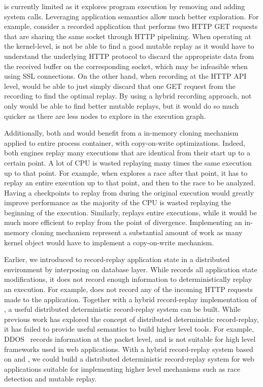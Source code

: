 \dora is currently limited as it explores program execution
by removing and adding system calls. Leveraging application semantics allow
much better exploration. For example, consider a recorded application that
performs two HTTP GET requests that are sharing the same socket through HTTP
pipelining. When operating at the kernel-level, \dora is not be able to
find a good mutable replay as it would have to understand the underlying HTTP
protocol to discard the appropriate data from the received buffer on the
corresponding socket, which may be infeasible when using SSL connections.
On the other hand, when recording at the HTTP API level, \dora would be able to
just simply discard that one GET request from the recording to find the optimal
replay. By using a hybrid recording approach, not only \dora would be able to
find better mutable replays, but it would do so much quicker as there are
less nodes to explore in the execution graph.

Additionally, both \racepro and \dora would benefit from a in-memory cloning
mechanism applied to entire process container, with copy-on-write optimizations.
Indeed, both engines replay many executions that are identical from their start
up to a certain point. A lot of CPU is wasted replaying many times the same
execution up to that point. For example, when \racepro explores a race after
that point, it has to replay an entire execution up to that point, and then to
the race to be analyzed. Having a checkpoints to replay from during the original
execution would greatly improve performance as the majority of the CPU is wasted
replaying the beginning of the execution. Similarly, \dora replays entire
executions, while it would be much more efficient to replay from the point of
divergence. Implementing an in-memory cloning mechanism represent a substantial
amount of work as many kernel object would have to implement a copy-on-write
mechanism.

Earlier, we introduced \synapse to record-replay application state in a
distributed environment by interposing on database layer.  While \synapse
records all application state modifications, it does not record enough
information to deterministically replay an execution. For example, \synapse does
not record any of the incoming HTTP requests made to the application.  Together
with a hybrid record-replay implementation of \scribe, a useful distributed
deterministic record-replay system can be built.  While previous work has
explored the concept of distributed deterministic record-replay, it has failed
to provide useful semantics to build higher level tools. For example,
DDOS~\cite{ddos} records information at the packet level, and is not suitable
for high level frameworks used in web applications.  With a hybrid record-replay
system based on \scribe and \synapse, we could build a distributed deterministic
record-replay system for web applications suitable for implementing higher level
mechanisms such as race detection and mutable replay.

